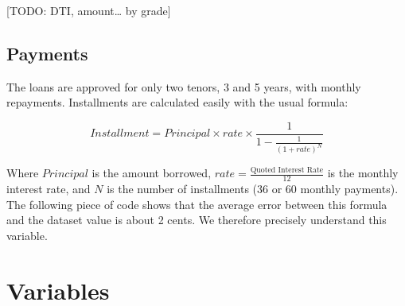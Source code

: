 \documentclass[11pt,]{report}
\newenvironment{Shaded}{\begin{snugshade}}{\end{snugshade}}
\newcommand{\DataTypeTok}[1]{\textcolor[rgb]{0.13,0.29,0.53}{#1}}
\newcommand{\DecValTok}[1]{\textcolor[rgb]{0.00,0.00,0.81}{#1}}
\newcommand{\KeywordTok}[1]{\textcolor[rgb]{0.13,0.29,0.53}{\textbf{#1}}}
\newcommand{\NormalTok}[1]{#1}
\newcommand{\OperatorTok}[1]{\textcolor[rgb]{0.81,0.36,0.00}{\textbf{#1}}}
\newcommand{\StringTok}[1]{\textcolor[rgb]{0.31,0.60,0.02}{#1}}
\begin{document}
{[}TODO: DTI, amount\ldots{} by grade{]}

\hypertarget{payments}{%
\subsection{Payments}\label{payments}}

The loans are approved for only two tenors, 3 and 5 years, with monthly repayments. Installments are calculated easily with the usual formula:

\[
Installment = Principal \times rate \times \frac{1}{1 - \frac{1}{(1+rate)^N}}
\]

Where \(Principal\) is the amount borrowed, \(rate = \frac{\text{Quoted Interest Rate}}{12}\) is the monthly interest rate, and \(N\) is the number of installments (36 or 60 monthly payments). The following piece of code shows that the average error between this formula and the dataset value is about 2 cents. We therefore precisely understand this variable.

\begin{Shaded}
\end{Shaded}

\hypertarget{variables}{%
\section{Variables}\label{variables}}
\end{document}
